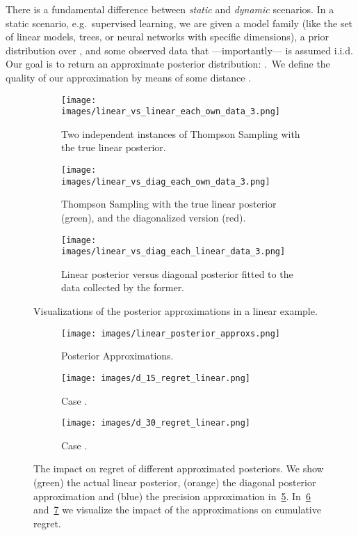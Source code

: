 \documentclass{article} \usepackage{iclr2018_conference,times}
\begin{document}
There is a fundamental difference between \emph{static} and \emph{dynamic} scenarios.
In a static scenario, e.g.\ supervised learning, we are given a model family  (like the set of linear models, trees, or neural networks with specific dimensions), a prior distribution  over , and some observed data  that ---importantly--- is assumed i.i.d.
Our goal is to return an approximate posterior distribution: .\,
We define the quality of our approximation by means of some distance .

\begin{figure}[t]
\begin{subfigure}[c]{0.95\textwidth}\texttt{[image: images/linear\_vs\_linear\_each\_own\_data\_3.png]}
  \caption{Two independent instances of Thompson Sampling with the true linear posterior.}
  \label{fig:lin1a}
\end{subfigure}
\begin{subfigure}[c]{0.95\textwidth}\texttt{[image: images/linear\_vs\_diag\_each\_own\_data\_3.png]}
  \caption{Thompson Sampling with the true linear posterior (green), and the diagonalized version (red).}
  \label{fig:lin1b}
\end{subfigure}
\begin{subfigure}[c]{0.95\textwidth}\texttt{[image: images/linear\_vs\_diag\_each\_linear\_data\_3.png]}
  \caption{Linear posterior versus diagonal posterior fitted to the data collected by the former.}
  \label{fig:lin1c}
\end{subfigure}
\caption{Visualizations of the posterior approximations in a linear example.}
\label{fig:lin1}
\end{figure}

\begin{figure}[t]
\begin{subfigure}[c]{0.31\textwidth}\texttt{[image: images/linear\_posterior\_approxs.png]}
  \caption{Posterior Approximations.}
  \label{fig:figure4}
\end{subfigure}
\begin{subfigure}[c]{0.31\textwidth}\texttt{[image: images/d\_15\_regret\_linear.png]}
  \caption{Case .}
  \label{fig:figure5}
\end{subfigure}
\begin{subfigure}[c]{0.31\textwidth}\texttt{[image: images/d\_30\_regret\_linear.png]}
  \caption{Case .}
  \label{fig:figure6}
\end{subfigure}
\caption{The impact on regret of different approximated posteriors. We show (green) the actual linear posterior, (orange) the diagonal posterior approximation and (blue) the precision approximation in~\ref{fig:figure4}.  In~\ref{fig:figure5} and~\ref{fig:figure6} we visualize the impact of the approximations on cumulative regret.}
\label{fig:lin2}
\end{figure}
\end{document}
